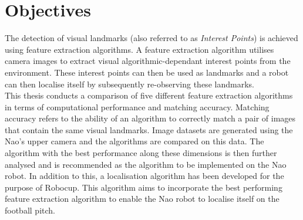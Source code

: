 \documentclass{report}
\begin{document}
\section{Objectives}
\label{sec:objectives}
The detection of visual landmarks (also referred to as \textit{Interest Points}) is achieved using feature extraction algorithms. A feature extraction algorithm utilises camera images to extract visual algorithmic-dependant interest points from the environment. These interest points can then be used as landmarks and a robot can then localise itself by subsequently re-observing these landmarks. \\

This thesis conducts a comparison of five different feature extraction algorithms in terms of computational performance and matching accuracy. Matching accuracy refers to the ability of an algorithm to correctly match a pair of images that contain the same visual landmarks. Image datasets are generated using the Nao's upper camera and the algorithms are compared on this data. The algorithm with the best performance along these dimensions is then further analysed and is recommended as the algorithm to be implemented on the Nao robot. In addition to this, a localisation algorithm has been developed for the purpose of Robocup. This algorithm aims to incorporate the best performing feature extraction algorithm to enable the Nao robot to localise itself on the football pitch.\\
\end{document}
